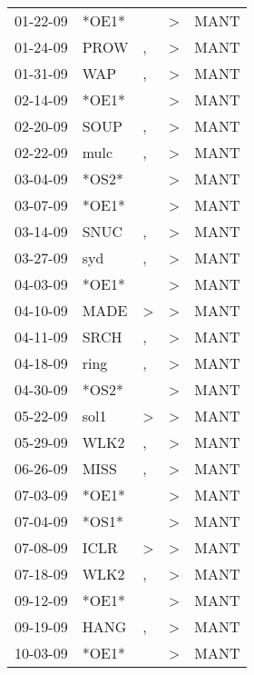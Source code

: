 \begin{supertabular}{lllll}
 01-22-09 &  *OE1* &               &  \textgreater &  MANT \\
 01-24-09 &   PROW &             , &  \textgreater &  MANT \\
 01-31-09 &    WAP &             , &  \textgreater &  MANT \\
 02-14-09 &  *OE1* &               &  \textgreater &  MANT \\
 02-20-09 &   SOUP &             , &  \textgreater &  MANT \\
 02-22-09 &   mulc &             , &  \textgreater &  MANT \\
 03-04-09 &  *OS2* &               &  \textgreater &  MANT \\
 03-07-09 &  *OE1* &               &  \textgreater &  MANT \\
 03-14-09 &   SNUC &             , &  \textgreater &  MANT \\
 03-27-09 &    syd &             , &  \textgreater &  MANT \\
 04-03-09 &  *OE1* &               &  \textgreater &  MANT \\
 04-10-09 &   MADE &  \textgreater &  \textgreater &  MANT \\
 04-11-09 &   SRCH &             , &  \textgreater &  MANT \\
 04-18-09 &   ring &             , &  \textgreater &  MANT \\
 04-30-09 &  *OS2* &               &  \textgreater &  MANT \\
 05-22-09 &   sol1 &  \textgreater &  \textgreater &  MANT \\
 05-29-09 &   WLK2 &             , &  \textgreater &  MANT \\
 06-26-09 &   MISS &             , &  \textgreater &  MANT \\
 07-03-09 &  *OE1* &               &  \textgreater &  MANT \\
 07-04-09 &  *OS1* &               &  \textgreater &  MANT \\
 07-08-09 &   ICLR &  \textgreater &  \textgreater &  MANT \\
 07-18-09 &   WLK2 &             , &  \textgreater &  MANT \\
 09-12-09 &  *OE1* &               &  \textgreater &  MANT \\
 09-19-09 &   HANG &             , &  \textgreater &  MANT \\
 10-03-09 &  *OE1* &               &  \textgreater &  MANT \\

\end{supertabular}
